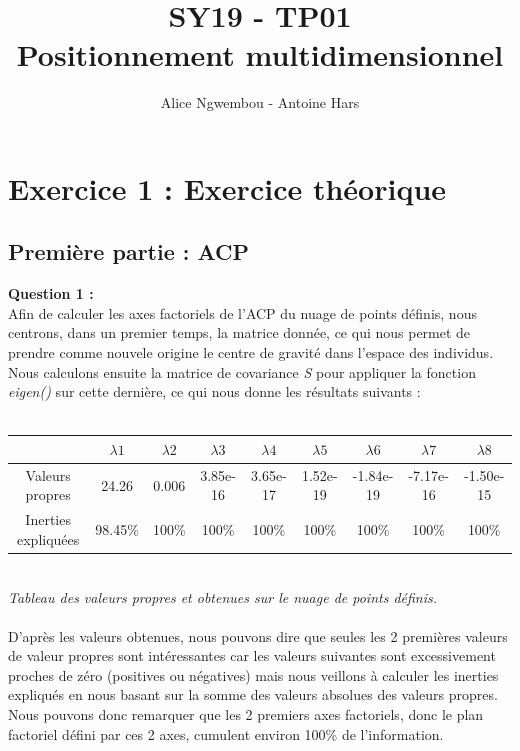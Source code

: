 \documentclass[a4paper, 10pt]{article}
\title{SY19 - TP01\\Positionnement multidimensionnel}
\author{Alice Ngwembou - Antoine Hars}
\begin{document}
\maketitle

\section*{Exercice 1 : Exercice théorique}
\subsection*{Première partie : ACP}
\textbf{Question 1 :}\\
Afin de calculer les axes factoriels de l'ACP du nuage de points définis, nous centrons, dans un premier temps, la matrice donnée,
ce qui nous permet de prendre comme nouvele origine le centre de gravité dans l'espace des individus.\\
Nous calculons ensuite la matrice de covariance \textit{S} pour appliquer la fonction \textit{eigen()} sur cette dernière,
ce qui nous donne les résultats suivants :\\ \\
\begin{tabular}{|c|c|c|c|c|c|c|c|c|}
\hline
 & $\lambda1$ & $\lambda2$ & $\lambda3$ & $\lambda4$ & $\lambda5$ & $\lambda6$ & $\lambda7$ & $\lambda8$ \\
\hline
Valeurs propres & 24.26 & 0.006 & 3.85e-16 & 3.65e-17 & 1.52e-19 & -1.84e-19 & -7.17e-16 & -1.50e-15 \\
\hline
Inerties expliquées & 98.45\% & 100\% & 100\% & 100\% & 100\% & 100\% & 100\% & 100\% \\
\hline
\end{tabular}\\
\textit{Tableau des valeurs propres et obtenues sur le nuage de points définis.}\\ \\
D'après les valeurs obtenues, nous pouvons dire que seules les 2 premières valeurs de valeur propres sont intéressantes car les valeurs
suivantes sont excessivement proches de zéro (positives ou négatives) mais nous veillons à calculer les inerties expliqués en nous
basant sur la somme des valeurs absolues des valeurs propres.\\
Nous pouvons donc remarquer que les 2 premiers axes factoriels, donc le plan factoriel défini par ces 2 axes,
cumulent environ 100\% de l'information.\\ \\
\end{document}
